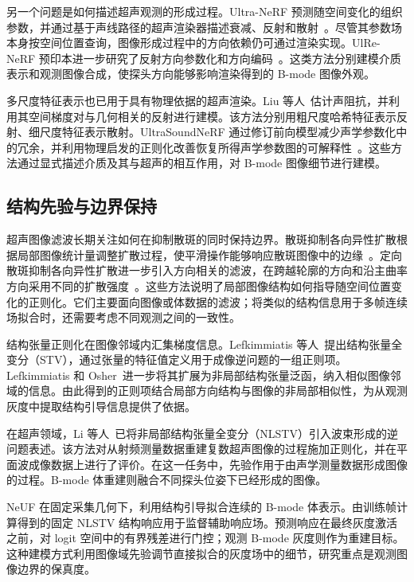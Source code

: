 另一个问题是如何描述超声观测的形成过程。Ultra-NeRF 预测随空间变化的组织参数，并通过基于声线路径的超声渲染器描述衰减、反射和散射~\cite{wysocki2024ultranerf}。尽管其参数场本身按空间位置查询，图像形成过程中的方向依赖仍可通过渲染实现。UlRe-NeRF 预印本进一步研究了反射方向参数化和方向编码~\cite{guo2024ulre}。这类方法分别建模介质表示和观测图像合成，使探头方向能够影响渲染得到的 B-mode 图像外观。

多尺度特征表示也已用于具有物理依据的超声渲染。Liu 等人~\cite{liu2026geometry}估计声阻抗，并利用其空间梯度对与几何相关的反射进行建模。该方法分别用粗尺度哈希特征表示反射、细尺度特征表示散射。UltraSoundNeRF 通过修订前向模型减少声学参数化中的冗余，并利用物理启发的正则化改善恢复所得声学参数图的可解释性~\cite{wysocki2026usnerf}。这些方法通过显式描述介质及其与超声的相互作用，对 B-mode 图像细节进行建模。

\subsection{结构先验与边界保持}

超声图像滤波长期关注如何在抑制散斑的同时保持边界。散斑抑制各向异性扩散根据局部图像统计量调整扩散过程，使平滑操作能够响应散斑图像中的边缘~\cite{yu2002srad}。定向散斑抑制各向异性扩散进一步引入方向相关的滤波，在跨越轮廓的方向和沿主曲率方向采用不同的扩散强度~\cite{krissian2007osrad}。这些方法说明了局部图像结构如何指导随空间位置变化的正则化。它们主要面向图像或体数据的滤波；将类似的结构信息用于多帧连续场拟合时，还需要考虑不同观测之间的一致性。

结构张量正则化在图像邻域内汇集梯度信息。Lefkimmiatis 等人~\cite{lefkimmiatis2015stv}提出结构张量全变分（STV），通过张量的特征值定义用于成像逆问题的一组正则项。Lefkimmiatis 和 Osher~\cite{lefkimmiatis2015nonlocal}进一步将其扩展为非局部结构张量泛函，纳入相似图像邻域的信息。由此得到的正则项结合局部方向结构与图像的非局部相似性，为从观测灰度中提取结构引导信息提供了依据。

在超声领域，Li 等人~\cite{li2026ipbnlstv}已将非局部结构张量全变分（NLSTV）引入波束形成的逆问题表述。该方法对从射频测量数据重建复数超声图像的过程施加正则化，并在平面波成像数据上进行了评价。在这一任务中，先验作用于由声学测量数据形成图像的过程。B-mode 体重建则融合不同探头位姿下已经形成的图像。

NeUF 在固定采集几何下，利用结构引导拟合连续的 B-mode 体表示。由训练帧计算得到的固定 NLSTV 结构响应用于监督辅助响应场。预测响应在最终灰度激活之前，对 logit 空间中的有界残差进行门控；观测 B-mode 灰度则作为重建目标。这种建模方式利用图像域先验调节直接拟合的灰度场中的细节，研究重点是观测图像边界的保真度。
